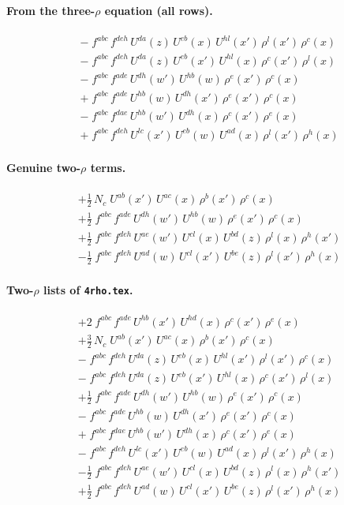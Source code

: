 \documentclass[10pt]{article}
\numberwithin{equation}{section}
\begin{document}
\paragraph{From the three-$\rho$ equation (all rows).}
\begin{align*}
&-\;f^{abc}\,f^{deh}\,U^{da}(z)\,U^{eb}(x)\,U^{hl}(x')\,\rho^{l}(x')\,\rho^{c}(x)\\&-\;f^{abc}\,f^{deh}\,U^{da}(z)\,U^{eb}(x')\,U^{hl}(x)\,\rho^{c}(x')\,\rho^{l}(x)\\&-\;f^{abc}\,f^{ade}\,U^{dh}(w')\,U^{hb}(w)\,\rho^{e}(x')\,\rho^{c}(x)\\&+\;f^{abc}\,f^{ade}\,U^{hb}(w)\,U^{dh}(x')\,\rho^{e}(x')\,\rho^{c}(x)\\&-\;f^{abc}\,f^{dae}\,U^{hb}(w')\,U^{dh}(x)\,\rho^{c}(x')\,\rho^{e}(x)\\&+\;f^{abc}\,f^{deh}\,U^{lc}(x')\,U^{eb}(w)\,U^{ad}(x)\,\rho^{l}(x')\,\rho^{h}(x)
\end{align*}
\paragraph{Genuine two-$\rho$ terms.}
\begin{align*}
&+\tfrac{1}{2}\,N_c\;U^{ab}(x')\,U^{ac}(x)\,\rho^{b}(x')\,\rho^{c}(x)\\&+\tfrac{1}{2}\;f^{abc}\,f^{ade}\,U^{dh}(w')\,U^{hb}(w)\,\rho^{e}(x')\,\rho^{c}(x)\\&+\tfrac{1}{2}\;f^{abc}\,f^{deh}\,U^{ae}(w')\,U^{cl}(x)\,U^{bd}(z)\,\rho^{l}(x)\,\rho^{h}(x')\\&-\tfrac{1}{2}\;f^{abc}\,f^{deh}\,U^{ad}(w)\,U^{cl}(x')\,U^{be}(z)\,\rho^{l}(x')\,\rho^{h}(x)
\end{align*}
\paragraph{Two-$\rho$ lists of \texttt{4rho.tex}.}
\begin{align*}
&+2\;f^{abc}\,f^{ade}\,U^{hb}(x')\,U^{hd}(x)\,\rho^{c}(x')\,\rho^{e}(x)\\&+\tfrac{3}{2}\,N_c\;U^{ab}(x')\,U^{ac}(x)\,\rho^{b}(x')\,\rho^{c}(x)\\&-\;f^{abc}\,f^{deh}\,U^{da}(z)\,U^{eb}(x)\,U^{hl}(x')\,\rho^{l}(x')\,\rho^{c}(x)\\&-\;f^{abc}\,f^{deh}\,U^{da}(z)\,U^{eb}(x')\,U^{hl}(x)\,\rho^{c}(x')\,\rho^{l}(x)\\&+\tfrac{1}{2}\;f^{abc}\,f^{ade}\,U^{dh}(w')\,U^{hb}(w)\,\rho^{e}(x')\,\rho^{c}(x)\\&-\;f^{abc}\,f^{ade}\,U^{hb}(w)\,U^{dh}(x')\,\rho^{e}(x')\,\rho^{c}(x)\\&+\;f^{abc}\,f^{dae}\,U^{hb}(w')\,U^{dh}(x)\,\rho^{c}(x')\,\rho^{e}(x)\\&-\;f^{abc}\,f^{deh}\,U^{lc}(x')\,U^{eb}(w)\,U^{ad}(x)\,\rho^{l}(x')\,\rho^{h}(x)\\&-\tfrac{1}{2}\;f^{abc}\,f^{deh}\,U^{ae}(w')\,U^{cl}(x)\,U^{bd}(z)\,\rho^{l}(x)\,\rho^{h}(x')\\&+\tfrac{1}{2}\;f^{abc}\,f^{deh}\,U^{ad}(w)\,U^{cl}(x')\,U^{be}(z)\,\rho^{l}(x')\,\rho^{h}(x)
\end{align*}
\end{document}
